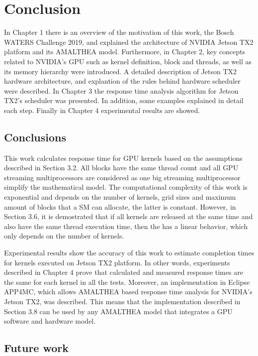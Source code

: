 \documentclass[
  12pt,
  a4paperpaper,
]{report}
\begin{document}
\hypertarget{conclusion}{%
\chapter{Conclusion}\label{conclusion}}

In Chapter 1 there is an overview of the motivation of this work, the
Bosch WATERS Challenge 2019, and explained the architecture of NVIDIA Jetson
TX2 platform and its AMALTHEA model. Furthermore, in Chapter 2, 
key concepts related to NVIDIA's GPU such as kernel
definition, block and threads, as well as its memory hierarchy were introduced.
A detailed description of Jetson TX2 hardware architecture, and explantion of the
rules behind hardware scheduler were described.
In Chapter 3 the response time analysis algorithm for Jetson TX2's scheduler was presented.
In addition, some examples  explained in detail each step. 
Finally in Chapter 4 experimental results are showed.

\hypertarget{conclusions}{%
\section{Conclusions}\label{conclusions}}

This work calculates response time for GPU kernels based on the assumptions described in Section 3.2.
All blocks have the same thread count and all GPU streaming multiprocessors are considered as one big streaming multiprocessor simplify the mathematical model.
The computational complexity of this work is exponential and depends on the number of kernels, grid sizes and maximum amount of blocks that a SM can allocate, the latter is constant.
However, in Section 3.6, it is demostrated that if all kernels are released at the same time and also have the same thread execution time, then the has a linear behavior, which only depends on the number of kernels.

Experimental results show the accuracy of this work to estimate completion times for kernels executed on Jetson TX2 platform.
In other words, experiments described in Chapter 4 prove that  calculated and measured response times are the same for each kernel in all the tests. 
Moreover, an implementation in Eclipse APP4MC, which allows AMALTHEA based response time analysis for NVIDIA's Jetson TX2, was described.
This means that the implementation described in Section 3.8 can be used by any AMALTHEA model that integrates a GPU software and hardware model. 

\hypertarget{future-work}{%
\section{Future work}\label{future-work}}
\end{document}
